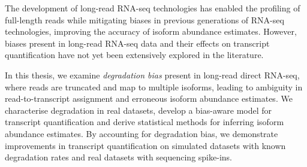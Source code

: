 
The development of long-read RNA-seq technologies has enabled the profiling of full-length reads while mitigating biases in previous generations of RNA-seq technologies, improving the accuracy of isoform abundance estimates. However, biases present in long-read RNA-seq data and their effects on transcript quantification have not yet been extensively explored in the literature. 

In this thesis, we examine \textit{degradation bias} present in long-read direct RNA-seq, where reads are truncated and map to multiple isoforms, leading to ambiguity in read-to-transcript assignment and erroneous isoform abundance estimates. We characterise degradation in real datasets, develop a bias-aware model for transcript quantification and derive statistical methods for inferring isoform abundance estimates. By accounting for degradation bias, we demonstrate improvements in transcript quantification on simulated datasets with known degradation rates and real datasets with sequencing spike-ins.

